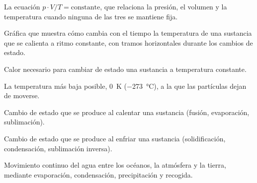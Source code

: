 \begin{vocabulary}
    La ecuación \(p \cdot V / T = \text{constante}\), que relaciona la presión, el volumen y la temperatura cuando ninguna de las tres se mantiene fija.
\end{vocabulary}

\begin{vocabulary}
    Gráfica que muestra cómo cambia con el tiempo la temperatura de una sustancia que se calienta a ritmo constante, con tramos horizontales durante los cambios de estado.
\end{vocabulary}

\begin{vocabulary}
    Calor necesario para cambiar de estado una sustancia a temperatura constante.
\end{vocabulary}

\begin{vocabulary}
    La temperatura más baja posible, \qty{0}{\K} (\qty{-273}{\celsius}), a la que las partículas dejan de moverse.
\end{vocabulary}

\begin{vocabulary}
    Cambio de estado que se produce al calentar una sustancia (fusión, evaporación, sublimación).
\end{vocabulary}

\begin{vocabulary}
    Cambio de estado que se produce al enfriar una sustancia (solidificación, condensación, sublimación inversa).
\end{vocabulary}

\begin{vocabulary}
    Movimiento continuo del agua entre los océanos, la atmósfera y la tierra, mediante evaporación, condensación, precipitación y recogida.
\end{vocabulary}
